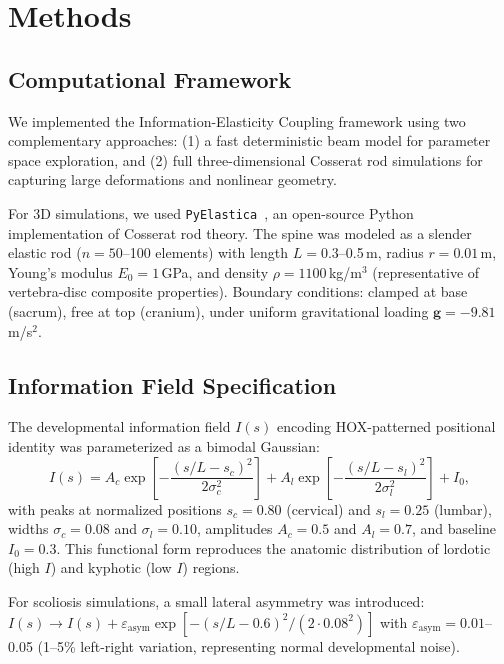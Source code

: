 \section{Methods}

\subsection{Computational Framework}

We implemented the Information-Elasticity Coupling framework using two complementary approaches: (1) a fast deterministic beam model for parameter space exploration, and (2) full three-dimensional Cosserat rod simulations for capturing large deformations and nonlinear geometry.

For 3D simulations, we used \texttt{PyElastica}~\cite{pyelastica_zenodo,gazzola2018forward}, an open-source Python implementation of Cosserat rod theory. The spine was modeled as a slender elastic rod ($n=50$--100 elements) with length $L=0.3$--0.5\,m, radius $r=0.01$\,m, Young's modulus $E_0=1$\,GPa, and density $\rho=1100$\,kg/m$^3$ (representative of vertebra-disc composite properties). Boundary conditions: clamped at base (sacrum), free at top (cranium), under uniform gravitational loading $\mathbf{g} = -9.81$\,m/s$^2$.

\subsection{Information Field Specification}

The developmental information field $I(s)$ encoding HOX-patterned positional identity was parameterized as a bimodal Gaussian:
\begin{equation}
I(s) = A_c \exp\left[-\frac{(s/L - s_c)^2}{2\sigma_c^2}\right] + A_l \exp\left[-\frac{(s/L - s_l)^2}{2\sigma_l^2}\right] + I_0,
\label{eq:info_field}
\end{equation}
with peaks at normalized positions $s_c = 0.80$ (cervical) and $s_l = 0.25$ (lumbar), widths $\sigma_c = 0.08$ and $\sigma_l = 0.10$, amplitudes $A_c = 0.5$ and $A_l = 0.7$, and baseline $I_0 = 0.3$. This functional form reproduces the anatomic distribution of lordotic (high $I$) and kyphotic (low $I$) regions.

For scoliosis simulations, a small lateral asymmetry was introduced: $I(s) \to I(s) + \varepsilon_{\mathrm{asym}} \exp[-(s/L - 0.6)^2/(2 \cdot 0.08^2)]$ with $\varepsilon_{\mathrm{asym}} = 0.01$--0.05 (1--5\% left-right variation, representing normal developmental noise).

